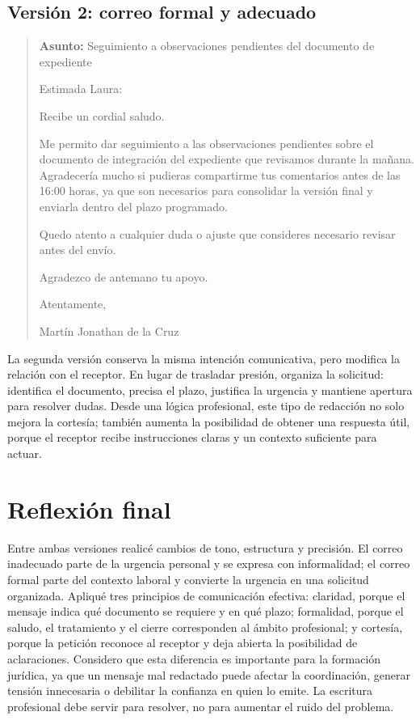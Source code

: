 \documentclass[
	spanish,
	letterpaper, oneside
]{article}
\begin{document}
\subsection{Versión 2: correo formal y adecuado}

\begin{quote}
\textbf{Asunto:} Seguimiento a observaciones pendientes del documento de expediente

Estimada Laura:

Recibe un cordial saludo.

Me permito dar seguimiento a las observaciones pendientes sobre el documento de integración del expediente que revisamos durante la mañana. Agradecería mucho si pudieras compartirme tus comentarios antes de las 16:00 horas, ya que son necesarios para consolidar la versión final y enviarla dentro del plazo programado.

Quedo atento a cualquier duda o ajuste que consideres necesario revisar antes del envío.

Agradezco de antemano tu apoyo.

Atentamente,

Martín Jonathan de la Cruz
\end{quote}

La segunda versión conserva la misma intención comunicativa, pero modifica la relación con el receptor. En lugar de trasladar presión, organiza la solicitud: identifica el documento, precisa el plazo, justifica la urgencia y mantiene apertura para resolver dudas. Desde una lógica profesional, este tipo de redacción no solo mejora la cortesía; también aumenta la posibilidad de obtener una respuesta útil, porque el receptor recibe instrucciones claras y un contexto suficiente para actuar.

\section{Reflexión final}

Entre ambas versiones realicé cambios de tono, estructura y precisión. El correo inadecuado parte de la urgencia personal y se expresa con informalidad; el correo formal parte del contexto laboral y convierte la urgencia en una solicitud organizada. Apliqué tres principios de comunicación efectiva: claridad, porque el mensaje indica qué documento se requiere y en qué plazo; formalidad, porque el saludo, el tratamiento y el cierre corresponden al ámbito profesional; y cortesía, porque la petición reconoce al receptor y deja abierta la posibilidad de aclaraciones. Considero que esta diferencia es importante para la formación jurídica, ya que un mensaje mal redactado puede afectar la coordinación, generar tensión innecesaria o debilitar la confianza en quien lo emite. La escritura profesional debe servir para resolver, no para aumentar el ruido del problema.
\end{document}
